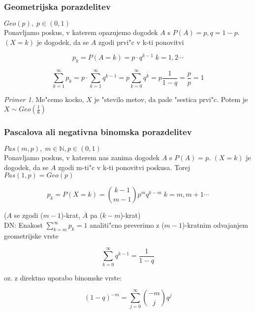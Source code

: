 \documentclass[a4paper,12pt]{article}
\theoremstyle{definition}
\theoremstyle{remark}
\newtheorem*{ex}{Primer}
\newcommand{\N}{\mathbb{N}}
\begin{document}
\subsubsection{Geometrijska porazdelitev}

$Geo(p), \; p \in (0,1)$ \\
Ponavljamo poskus, v katerem opazujemo dogodek $A$ s $P(A) = p, q = 1-p$. $(X=k)$ je dogodek, da se $A$ zgodi prvi"c
v k-ti ponovitvi

\begin{equation*}
    p_k = P(A = k) = p \cdot q^{k-1} \; k = 1, 2 \cdots
\end{equation*}

\begin{equation*}
    \sum_{k=1}^{\infty} p_k = p \cdot \sum_{k=1}^{\infty} q^{k-1} = p \sum_{k=0}^{\infty} q^k =
    p \frac{1}{1-q} = \frac{p}{p} = 1
\end{equation*}

\begin{ex}
    Me"cemo kocko, $X$ je "stevilo metov, da pade "sestica prvi"c. Potem je $X \sim Geo(\frac{1}{6})$
\end{ex}

\subsubsection{Pascalova ali negativna binomska porazdelitev}

$Pas(m,p), \; m \in \N, p \in (0,1)$ \\
Ponavljamo poskus, v katerem nas zanima dogodek $A$ s $P(A) = p$. $(X=k)$ je dogodek, da se $A$ zgodi m-ti"c v
k-ti ponovitvi poskusa. Torej $Pas(1,p) = Geo(p)$

\begin{equation*}
    p_k = P(X = k) = \binom{k-1}{m-1} p^m q^{k-m} \; k = m, m+1 \cdots
\end{equation*}

($A$ se zgodi ($m-1$)-krat, $\overline{A}$ pa ($k-m$)-krat) \\
DN: Enakost $\sum_{k=m}^{\infty} p_k = 1$ analiti"cno preverimo z ($m-1$)-kratnim odvajanjem geometrijske vrste

\begin{equation*}
    \sum_{k=0}^{\infty} q^{k-1} = \frac{1}{1-q}
\end{equation*}

oz. z direktno uporabo binomske vrste:

\begin{equation*}
    (1-q)^{-m} = \sum_{j=0}^{\infty} \binom{-m}{j} q^j
\end{equation*}
\end{document}
